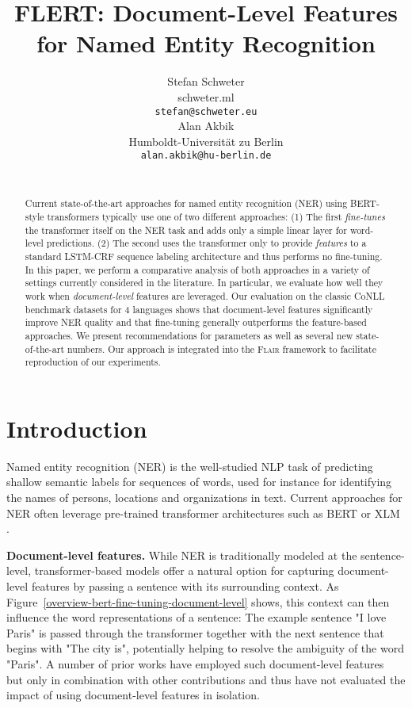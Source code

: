 \documentclass[11pt,a4paper]{article}
\title{FLERT: Document-Level Features for Named Entity Recognition}
\author{
Stefan Schweter \\
	schweter.ml\\
	{\tt stefan@schweter.eu}\\\And
Alan Akbik \\
	Humboldt-Universität zu Berlin\\
	{\tt alan.akbik@hu-berlin.de}\\
\\}
\date{}
\begin{document}
\maketitle
\begin{abstract}

Current state-of-the-art approaches for named entity recognition (NER) using BERT-style transformers typically use one of two different approaches: (1) The first \textit{fine-tunes} the transformer itself on the NER task and adds only a simple linear layer for word-level predictions. (2) The second uses the transformer only to provide \textit{features} to a standard LSTM-CRF sequence labeling architecture and thus performs no fine-tuning. In this paper, we perform a comparative analysis of both approaches in a variety of settings currently considered in the literature. In particular, we evaluate how well they work when \textit{document-level} features are leveraged. Our evaluation on the classic CoNLL benchmark datasets for 4 languages shows that document-level features significantly improve NER quality and that fine-tuning generally outperforms the feature-based approaches. We present recommendations for parameters as well as several new state-of-the-art numbers. Our approach is integrated into the \textsc{Flair} framework to facilitate reproduction of our experiments.  

\end{abstract}

\section{Introduction}

Named entity recognition (NER) is the well-studied NLP task of predicting shallow semantic labels for sequences of words, used for instance for identifying the names of persons, locations and organizations in text. Current approaches for NER often leverage pre-trained transformer architectures such as BERT \citep{devlin-etal-2019-bert} or XLM \citep{lample2019cross}.

\noindent 
\textbf{Document-level features.} While NER is traditionally modeled at the sentence-level, transformer-based models offer a natural option for capturing document-level features by passing a sentence with its surrounding context. As Figure~\ref{overview-bert-fine-tuning-document-level} shows, this context can then influence the word representations of a sentence: The example sentence "I love Paris" is passed through the transformer together with the next sentence that begins with "The city is", potentially helping to resolve the ambiguity of the word "Paris".  
A number of prior works have employed such document-level features~\cite{devlin-etal-2019-bert, virtanen2019multilingual,yu-etal-2020-named} but only in combination with other contributions and thus have not evaluated the impact of using document-level features in isolation. 
\end{document}
